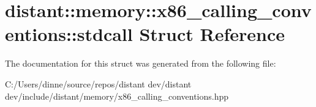 \hypertarget{structdistant_1_1memory_1_1x86__calling__conventions_1_1stdcall}{}\section{distant\+:\+:memory\+:\+:x86\+\_\+calling\+\_\+conventions\+:\+:stdcall Struct Reference}
\label{structdistant_1_1memory_1_1x86__calling__conventions_1_1stdcall}


The documentation for this struct was generated from the following file\+:\begin{DoxyCompactItemize}
\item 
C\+:/\+Users/dinne/source/repos/distant dev/distant dev/include/distant/memory/x86\+\_\+calling\+\_\+conventions.\+hpp\end{DoxyCompactItemize}

